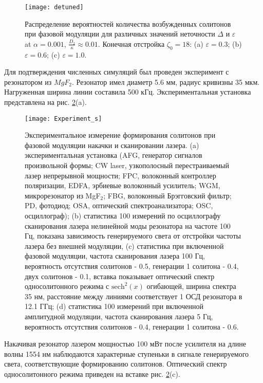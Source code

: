 \begin{figure}[ht]
\centering
  \texttt{[image: detuned]}
  \caption{Распределение вероятностей количества возбужденных солитонов при фазовой модуляции для различных значений неточности $ \Delta$  и $\varepsilon$  at  $\alpha=0.001$, $\frac{D_2}{\kappa}\approx 0.01 $. Конечная отстройка $\zeta_0=18$: (a) $\varepsilon=0.3$; (b) $\varepsilon=0.6$; (c) $\varepsilon=1.0$.}
  \label{Detuned}
\end{figure}

Для подтверждения численных симуляций был проведен эксперимент с резонатором из $MgF_2$. Резонатор имел диаметр 5.6 мм, радиус кривизны 35 мкм. Нагруженная ширина линии составила 500 кГц. Экспериментальная установка представлена на рис. \ref{chaos_order_experiment}(a).

\begin{figure}[ht]
\centering
  \texttt{[image: Experiment\_s]}
  \caption{Экспериментальное измерение формирования солитонов при фазовой модуляции накачки и сканировании лазера. (a) экспериментальная установка (AFG, генератор сигналов произвольной формы; CW laser, узкополосный перестраиваемый лазер непрерывной мощности; FPC, волоконный контроллер поляризации, EDFA, эрбиевые волоконный усилитель; WGM,  микрорезонатор из MgF$_2$; FBG, волоконный Брэгговский фильтр; PD, фотодиод; OSA, оптический спектроанализатора; OSC, осциллограф); (b) статистика 100 измерений по осциллографу сканирования лазера нелинейной моды резонатора на частоте 100 Гц, показана зависимость генерируемого света от отстройки частоты лазера без внешней модуляции, (c) статистика при включенной фазовой модуляции, частота сканирования лазера 100 Гц, вероятность отсутствия солитонов - 0.5, генерации 1 солитона - 0.4, двух солитонов - 0.1, вставка показывает оптический спектр односолитонного режима с $\text{sech}^2(x)$ огибающей, ширина спектра 35 нм, расстояние между линиями соответствует 1 ОСД резонатора в 12.1 ГГц; (d) статистика 100 измерений при включенной амплитудной модуляции, частота сканирования лазера 5 Гц, вероятность отсутствия солитонов - 0.4, генерации 1 солитона - 0.6.}
  \label{chaos_order_experiment}
\end{figure}

Накачивая резонатор лазером мощностью 100 мВт после усилителя на длине волны 1554 нм наблюдаются характерные ступеньки в сигнале генерируемого света, соответствующие формированию солитонов. Оптический спектр односолитонного режима приведен на вставке рис. \ref{chaos_order_experiment}(c).

